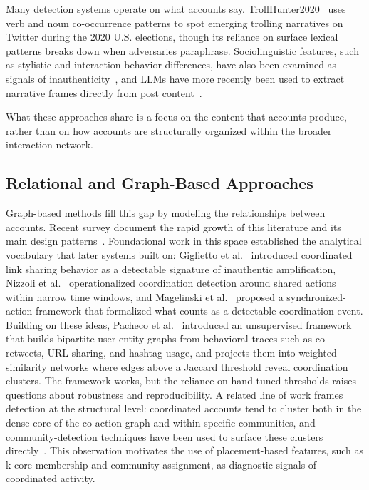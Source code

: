 \documentclass[10pt,journal,compsoc]{IEEEtran}
\begin{document}
Many detection systems operate on what accounts say. TrollHunter2020~\cite{jachim2021trollhunter2020} uses verb and noun co-occurrence patterns to spot emerging trolling narratives on Twitter during the 2020 U.S. elections, though its reliance on surface lexical patterns breaks down when adversaries paraphrase. Sociolinguistic features, such as stylistic and interaction-behavior differences, have also been examined as signals of inauthenticity~\cite{SocioLinguistic2024coordinated}, and LLMs have more recently been used to extract narrative frames directly from post content~\cite{burghardt2024large}.

What these approaches share is a focus on the content that accounts produce, rather than on how accounts are structurally organized within the broader interaction network.

\subsection{Relational and Graph-Based Approaches}

Graph-based methods fill this gap by modeling the relationships between accounts. Recent survey document the rapid growth of this literature and its main design patterns~\cite{mannocci2024detection}. Foundational work in this space established the analytical vocabulary that later systems built on: Giglietto et al.~\cite{giglietto2020village} introduced coordinated link sharing behavior as a detectable signature of inauthentic amplification, Nizzoli et al.~\cite{coordinated2021UK} operationalized coordination detection around shared actions within narrow time windows, and Magelinski et al.~\cite{magelinski2022synchronized} proposed a synchronized-action framework that formalized what counts as a detectable coordination event. Building on these ideas, Pacheco et al.~\cite{pacheco2021uncovering} introduced an
unsupervised framework that builds bipartite user-entity graphs from behavioral traces such as co-retweets, URL sharing, and hashtag usage, and projects them
into weighted similarity networks where edges above a Jaccard threshold reveal coordination clusters. The framework works, but the reliance on
hand-tuned thresholds raises questions about robustness and reproducibility. A related line of work frames detection at the structural level: coordinated accounts tend to cluster both in the dense core of the co-action graph and within specific communities, and community-detection techniques have been used to surface these clusters directly~\cite{gang2020coordinating}. This observation motivates the use of placement-based features, such as k-core membership and community assignment, as diagnostic signals of coordinated activity.
\end{document}
